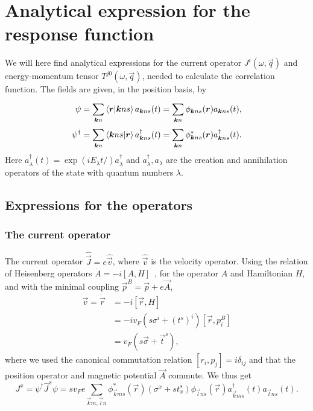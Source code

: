 \section{Analytical expression for the response function}
We will here find analytical expressions for the current operator $J^i(\omega, \vec{q})$ and energy-momentum tensor $T^{j 0}(\omega, \vec{q})$, needed to calculate the correlation function.
The fields are given, in the position basis, by
\begin{align}
  \psi &= \sum\limits_{\bm{k}n}^{}\braket{\bm{r} | \bm{k} n s} a_{\bm{k}ns}(t) = \sum\limits_{\bm{k}n}^{} \phi_{\bm{k} n s} (\bm{r}) a_{\bm{k}n s}(t),\\
  \psi^{\dagger} &= \sum\limits_{\bm{k}n}^{}
                   \braket{\bm{k} ns | \bm{r} }
                   a^{\dagger}_{\bm{k}ns}(t)
                   =\sum\limits_{\bm{k}n}^{} \phi^{*}_{\bm{k} n s} (\bm{r}) a^{\dagger}_{\bm{k}n s}(t).
\end{align}
Here $a_{\lambda }^{\dagger} (t) = \exp(iE_{\lambda } t / ) a_{\lambda }^{\dagger}$ and $a_{\lambda }^{\dagger}, a_{\lambda }$ are the creation and annihilation operators of the state with quantum numbers $\lambda $.
\subsection{Expressions for the operators}
\subsubsection{The current operator}
The current operator $\hat{\vec{J}} = e \hat{\vec{v}}$, where $\hat{\vec{v}}$ is the velocity operator.
Using the relation of Heisenberg operators $\dot{A} = -i [A, H] $~\cite{sakuraiModernQuantumMechanics2017}, for the operator $A$ and Hamiltonian $H$, and with the minimal coupling \( \vec{p}^B = \vec{p} + e \vec{A} \),
\begin{align}
  \vec{v} = \dot{\vec{r}} &= -i \left[ \vec{r}, H \right]\\
  &= -i v_F (s \sigma^i + (t^s)^i) \left[\vec{r}, p^B_i\right]\\
  &= v_F (s \vec{\sigma} + \vec{t}^s),
\end{align}
where we used the canonical commutation relation \( [r_i, p_j] = i \delta_{ij} \) and that the position operator and magnetic potential \( \vec{A} \) commute.
We thus get
\begin{equation}
  J^x = \psi ^{\dagger} \hat{J}^x \psi = sv_F e \sum\limits_{\vec{k}m, \vec{l}n}^{}
  \phi _{\vec{k}ms}^{*}(\vec{r}) \left(\sigma^x + s t^s_x\right) \phi _{\vec{l}ns}(\vec{r})
  a_{\vec{k}ms}^{\dagger}(t)
  a_{\vec{l}ns}(t).
\end{equation}

